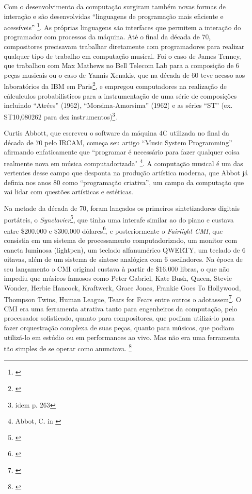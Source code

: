 Com o desenvolvimento da computação surgiram também novas formas de interação e são desenvolvidas ``linguagens de programação mais eficiente e acessíveis'' \footnote{\cite[p. 111]{IAZZETTA1997}}. As próprias linguagens são interfaces que permitem a interação do programador com processos da máquina. Até o final da década de 70, compositores precisavam trabalhar diretamente com programadores para realizar qualquer tipo de trabalho em computação musical. Foi o caso de James Tenney, que trabalhou com Max Mathews no Bell Telecom Lab para a composição de 6 peças musicais ou o caso de Yannis Xenakis, que na década de 60 teve acesso aos laboratórios da IBM em Paris\footnote{\cite{Holmes1985}}, e empregou computadores na realização de cálculculos probabilísticos para a instrumentação de uma série de composições incluindo ``Atrées'' (1962), ``Morsima-Amorsima'' (1962) e as séries ``ST'' (ex. ST\/10,080262 para dez instrumentos)\footnote{idem p. 263}.

Curtis Abbott, que escreveu o software da máquina 4C utilizada no final da década de 70 pelo IRCAM, começa seu artigo ``Music System Programming'' afirmando enfaticamente que ``programar é necessário para fazer qualquer coisa realmente nova em música computadorizada" \footnote{Abbot, C. in \cite[p. 51]{Roads1996}}. A computação musical é um das vertentes desse campo que desponta na produção artística moderna, que Abbot já definia nos anos 80 como ``programação criativa'', um campo da computação que vai lidar com questões artísticas e estéticas. 

Na metade da década de 70, foram lançados os primeiros sintetizadores digitais portáteis, o \emph{Synclavier}\footnote{\cite[p. 265]{Holmes1985}}, que tinha uma interafe similar ao do piano e custava entre \$200.000 e \$300.000 dólares\footnote{\cite{JosephParadiso1998}}, e posteriormente o \emph{Fairlight CMI}, que consistia em um sistema de processamento computadorizado, um monitor com caneta luminosa (lightpen), um teclado alfanumérico QWERTY, um teclado de 6 oitavas, além de um sistema de síntese analógica com 6 osciladores. Na época de seu lançamento o CMI original custava à partir de \$16.000 libras, o que não impediu que músicos famosos como Peter Gabriel, Kate Bush, Queen, Stevie Wonder, Herbie Hancock, Kraftwerk, Grace Jones, Frankie Goes To Hollywood, Thompson Twins, Human League, Tears for Fears entre outros o adotassem\footnote{\cite[p. 18]{Twyman2004}}. O CMI era uma ferramenta atrativa tanto para engenheiros da computação, pelo processador sofisticado, quanto para compositores, que podiam utilizá-lo para fazer orquestração complexa de suas peças, quanto para músicos, que podiam utilizá-lo em estúdio ou em performances ao vivo. Mas não era uma ferramenta tão simples de se operar como anunciava. \footnote{\cite[p. 55]{Twyman2004}}

